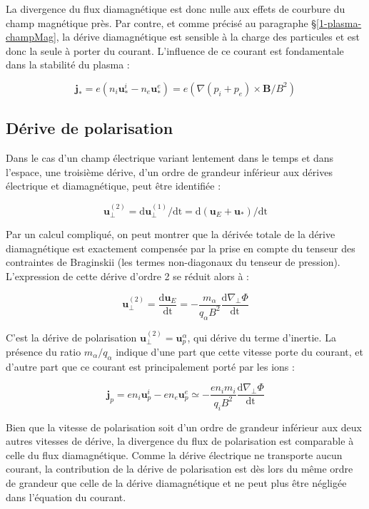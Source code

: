 \begin{refsection}
La divergence du flux diamagnétique est donc nulle aux effets de courbure du
champ magnétique près. Par contre, et comme
précisé au paragraphe \S\ref{1-plasma-champMag}, la dérive diamagnétique est 
sensible à la charge des particules et est donc la seule à porter du courant.
L'influence de ce courant est fondamentale dans la stabilité du plasma :

\begin{equation}
\mathbf j_*=e(n_i\mathbf u^i_*-n_e\mathbf
u^e_*)=e(\nabla(p_i+p_e)\times\mathbf B/B^2)
\end{equation}



\subsection{Dérive de polarisation}

Dans le cas d'un champ électrique variant lentement dans le temps et dans
l'espace, une troisième dérive, d'un ordre de grandeur inférieur aux dérives
électrique et diamagnétique, peut être identifiée : 

\begin{equation}
\label{1-vitessePol}
\mathbf{u}_\perp^{(2)}= \text{d}\mathbf
u_\perp^{(1)}/\text{dt}=\text{d}(\mathbf
u_E+\mathbf
u_*)/\text{dt}
\end{equation}

Par un calcul compliqué, on peut montrer que la dérivée totale de la dérive
diamagnétique est exactement compensée par la prise en compte du tenseur des
contraintes de Braginskii (les termes non-diagonaux du tenseur de
pression). L'expression de cette dérive d'ordre 2 se réduit alors à :

\begin{equation}
\label{1-vitessePol}
\mathbf{u}_\perp^{(2)}= \frac{\text{d}\mathbf
u_E}{\text{dt}}=-\frac{m_\alpha}{q_\alpha B^2}\frac{\text{d}\nabla_\perp
\Phi}{\text{dt}}
\end{equation}

C'est la dérive de polarisation $\mathbf{u}_\perp^{(2)}=\mathbf u^\alpha_p$, qui
dérive du terme d'inertie. La présence du ratio $m_\alpha/q_\alpha$ indique
d'une part que cette vitesse porte du courant, et d'autre part que ce
courant est principalement porté par les ions :

\begin{equation}
\label{1-courantPol}
\mathbf{j}_p = en_i\mathbf u^i_p-en_e\mathbf u^e_p\simeq
-\frac{en_im_i}{q_i B^2}\frac{\text{d}\nabla_\perp \Phi}{\text{dt}}
\end{equation}

Bien que la vitesse de polarisation soit d'un ordre de
grandeur inférieur aux deux autres vitesses de dérive, la divergence du flux 
de polarisation est comparable à celle du flux diamagnétique. Comme
la dérive électrique ne transporte aucun courant, la
contribution de la dérive de polarisation est dès lors du même ordre de
grandeur que celle de la dérive diamagnétique et ne peut plus être négligée
dans l'équation du courant.

%
%
\end{refsection}

